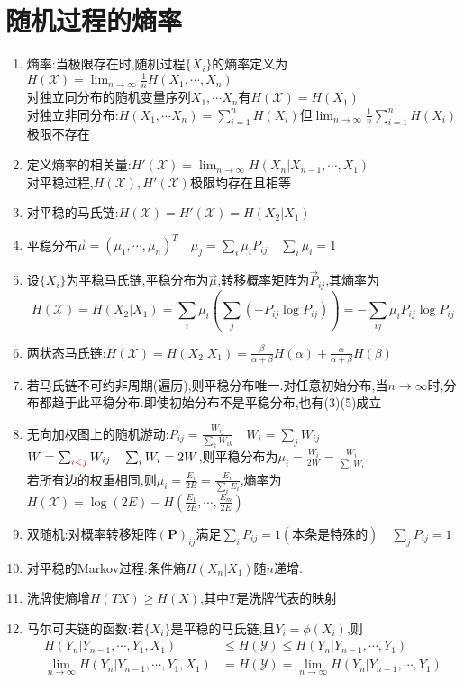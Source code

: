 \documentclass{article}
\begin{document}
\section{随机过程的熵率}
\begin{enumerate}[label=(\arabic*)]
	\item 熵率:当极限存在时,随机过程$\{X_i\}$的熵率定义为$H(\mathcal{X}) = \lim_{n \to \infty}\frac{1}{n}H(X_1,\cdots ,X_n)$\\
				对独立同分布的随机变量序列$X_1,\cdots X_n$有$H(\mathcal{X}) = H(X_1)$\\
				对独立非同分布:$H(X_1,\cdots X_n) = \sum_{i=1}^{n}H(X_i)$但$\lim_{n \to \infty}\frac{1}{n}\sum_{i=1}^{n}H(X_i)$极限不存在
	\item 定义熵率的{\red 相关量}:$H'(\mathcal{X}) = \lim_{n \to \infty}H(X_n|X_{n-1},\cdots ,X_1)$\\
				对{\red 平稳过程},$H(\mathcal{X}),H'(\mathcal{X})$极限均存在且相等
	\item 对平稳的马氏链:$H(\mathcal{X}) = H'(\mathcal{X}) = H(X_2|X_1)$
	\item 平稳分布$\vec{\mu} = (\mu_1,\cdots ,\mu_n)^T\quad \mu_j = \sum_i \mu_i P_{ij}\quad \sum_i \mu_i = 1$
	\item 设$\{X_i\}$为平稳马氏链,平稳分布为$\vec{\mu}$,转移概率矩阵为$\vec{P}_{ij}$,其熵率为
				\[H(\mathcal{X}) = H(X_2|X_1) = \sum_i \mu_i \left(\sum_j (-P_{ij}\log P_{ij})\right) = -\sum_{ij}\mu_i P_{ij}\log P_{ij}\]
	\item 两状态马氏链:$H(\mathcal{X}) = H(X_2|X_1) = \frac{\beta}{\alpha+\beta}H(\alpha)+\frac{\alpha}{\alpha+\beta}H(\beta)$
	\item 若马氏链不可约非周期(遍历),则平稳分布唯一.对{\red 任意}初始分布,当$n\to \infty$时,分布都趋于此平稳分布.即使初始分布不是平稳分布,也有(3)(5)成立
	\item 无向加权图上的随机游动:$P_{ij} = \frac{W_{ij}}{\sum_k W_{ik}}\quad W_i = \sum_j W_{ij}$\\
				$W=\sum_{\color{red} i<j}W_{ij}\quad \sum_i W_i = 2W$,则平稳分布为$\mu_i = \frac{W_i}{2W} = \frac{W_i}{\sum_i W_i}$\\
				若所有边的权重相同,则$\mu_i = \frac{E_i}{2E} = \frac{E_i}{\sum_i E_i}$,熵率为$H(\mathcal{X}) = \log(2E) - H\left(\frac{E_1}{2E},\cdots ,\frac{E_m}{2E}\right)$
	\item 双随机:对概率转移矩阵$(\bm{P})_{ij}$满足$\sum_i P_{ij} = 1(\text{本条是特殊的})\quad \sum_j P_{ij} = 1$
	\item 对平稳的Markov过程:条件熵$H(X_n|X_1)$随$n$递增.
	\item 洗牌使熵增$H(TX) \geq H(X)$,其中$T$是洗牌代表的映射
	\item 马尔可夫链的函数:若$\{X_i\}$是{\red 平稳的}马氏链,且$Y_i=\phi(X_i)$,则
				\[
					\begin{aligned}
						H(Y_n|Y_{n-1},\cdots ,Y_1,X_1) &\leq H(\mathcal{Y}) \leq H(Y_n|Y_{n-1},\cdots ,Y_1)\\
						\lim_{n \to \infty}H(Y_n|Y_{n-1},\cdots ,Y_1,X_1) &= H(\mathcal{Y}) = \lim_{n \to \infty}H(Y_n|Y_{n-1},\cdots ,Y_1)
					\end{aligned}
				\]
\end{enumerate}
\end{document}
